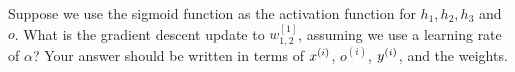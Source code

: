 \item {}
Suppose we use the sigmoid function as the activation function for $h_1, h_2, h_3$ and $o$.
What is the gradient descent update to $w_{1, 2}^{[1]}$, assuming we use a learning rate of $\alpha$?
Your answer should be written in terms of $x^{(i)}$, $o^{(i)}$, $y^{(i)}$, and the weights.

